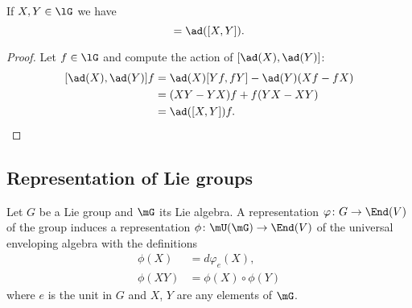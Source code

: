 \begin{lemma}       \label{LemAdesthioo}
	If \( X,Y\in\lG\) we have
	\begin{equation}
		[\ad(X),\ad(Y)]=\ad([X,Y]).
	\end{equation}
\end{lemma}

\begin{proof}
	Let \( f\in\lG\) and compute the action of \( [\ad(X),\ad(Y)]\):
	\begin{subequations}
		\begin{align}
			[\ad(X),\ad(Y)]f & =\ad(X)[Yf,fY]-\ad(Y)(Xf-fX) \\
			                 & =(XY-YX)f+f(YX-XY)           \\
			                 & =\ad([X,Y])f.
		\end{align}
	\end{subequations}
\end{proof}

\subsection{Representation of Lie groups}

\begin{proposition}
	Let $G$ be a Lie group and $\mG$ its Lie algebra. A representation $\varphi\colon G\to \End(V)$ of the group induces a representation $\phi\colon \mU(\mG)\to \End(V)$ of the universal enveloping algebra with the definitions
	\begin{subequations}
		\begin{align}
			\phi(X)  & =d\varphi_e(X),      \\
			\phi(XY) & =\phi(X)\circ\phi(Y)
		\end{align}
	\end{subequations}
	where $e$ is the unit in $G$ and $X$, $Y$ are any elements of $\mG$.
\end{proposition}

